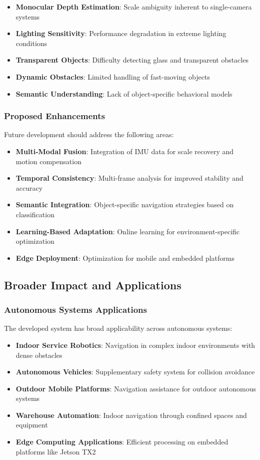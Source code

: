 \documentclass[12pt,oneside]{book}
\begin{document}
\begin{itemize}
\item \textbf{Monocular Depth Estimation}: Scale ambiguity inherent to single-camera systems
\item \textbf{Lighting Sensitivity}: Performance degradation in extreme lighting conditions
\item \textbf{Transparent Objects}: Difficulty detecting glass and transparent obstacles
\item \textbf{Dynamic Obstacles}: Limited handling of fast-moving objects
\item \textbf{Semantic Understanding}: Lack of object-specific behavioral models
\end{itemize}

\subsubsection{Proposed Enhancements}

Future development should address the following areas:

\begin{itemize}
\item \textbf{Multi-Modal Fusion}: Integration of IMU data for scale recovery and motion compensation
\item \textbf{Temporal Consistency}: Multi-frame analysis for improved stability and accuracy
\item \textbf{Semantic Integration}: Object-specific navigation strategies based on classification
\item \textbf{Learning-Based Adaptation}: Online learning for environment-specific optimization
\item \textbf{Edge Deployment}: Optimization for mobile and embedded platforms
\end{itemize}

\subsection{Broader Impact and Applications}

\subsubsection{Autonomous Systems Applications}

The developed system has broad applicability across autonomous systems:

\begin{itemize}
\item \textbf{Indoor Service Robotics}: Navigation in complex indoor environments with dense obstacles
\item \textbf{Autonomous Vehicles}: Supplementary safety system for collision avoidance
\item \textbf{Outdoor Mobile Platforms}: Navigation assistance for outdoor autonomous systems
\item \textbf{Warehouse Automation}: Indoor navigation through confined spaces and equipment
\item \textbf{Edge Computing Applications}: Efficient processing on embedded platforms like Jetson TX2
\end{itemize}
\end{document}
